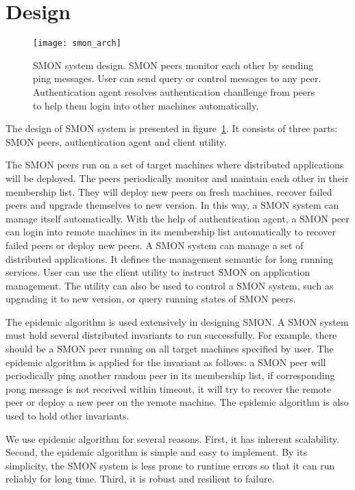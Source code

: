 \section{Design}
\label{sec:design}


\begin{figure}
\centering
\texttt{[image: smon\_arch]}
\caption{SMON system design. SMON peers monitor each
other by sending ping messages. User can send query or control messages
to any peer. Authentication agent resolves authentication
chanllenge from peers to help them login into other machines
automatically.}
\label{fig:smon_arch}
\end{figure}

The design of SMON system is presented in
figure~\ref{fig:smon_arch}.  It consists of three parts: SMON
peers, authentication agent and client utility.

The SMON peers run on a set of target machines where
distributed applications will be deployed. The peers
periodically monitor and maintain each other in their
membership list. They will deploy new peers on fresh
machines, recover failed peers and upgrade themselves to new
version. In this way, a SMON system can manage itself
automatically. With the help of authentication agent, a SMON
peer can login into remote machines in its membership list
automatically to recover failed peers or deploy new peers. A
SMON system can manage a set of distributed applications. It
defines the management semantic for long running services.
User can use the client utility to instruct SMON on
application management. The utility can also be used to
control a SMON system, such as upgrading it to new version,
or query running states of SMON peers.

The epidemic algorithm is used extensively in designing
SMON. A SMON system must hold several distributed invariants
to run successfully. For example, there should be a SMON
peer running on all target machines specified by user. The
epidemic algorithm is applied for the invariant as follows:
a SMON peer will periodically ping another random peer in
its membership list, if corresponding pong message is not
received within timeout, it will try to recover the remote
peer or deploy a new peer on the remote machine. The
epidemic algorithm is also used to hold other invariants.

We use epidemic algorithm for several reasons. First, it has
inherent scalability. Second, the epidemic algorithm is
simple and easy to implement. By its simplicity, the SMON
system is less prone to runtime errors so that it can run
reliably for long time. Third, it is robust and resilient to
failure.

